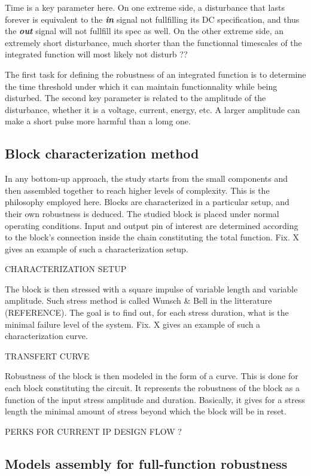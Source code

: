 Time is a key parameter here. On one extreme side, a disturbance that lasts forever is equivalent to the \textbf{\textit{in}} signal not fullfilling its DC specification,
and thus the \textbf{\textit{out}} signal will not fullfill its spec as well.
On the other extreme side, an extremely short disturbance, much shorter than the functionnal timescales of the integrated function will most likely not disturb ??

The first task for defining the robustness of an integrated function is to determine the time threshold under which it can maintain functionnality while being disturbed.
The second key parameter is related to the amplitude of the disturbance, whether it is a voltage, current, energy, etc.
A larger amplitude can make a short pulse more harmful than a lomg one.

\subsection{Block characterization method}
In any bottom-up approach, the study starts from the small components and then assembled together to reach higher levels of complexity.
This is the philosophy employed here.
Blocks are characterized in a particular setup, and their own robustness is deduced.
The studied block is placed under normal operating conditions.
Input and output pin of interest are determined according to the block's connection inside the chain constituting the total function.
Fix. X gives an example of such a characterization setup.

CHARACTERIZATION SETUP

The block is then stressed with a square impulse of variable length and variable amplitude.
Such stress method is called Wunsch & Bell in the litterature (REFERENCE).
The goal is to find out, for each stress duration, what is the minimal failure level of the system.
Fix. X gives an example of such a characterization curve.

TRANSFERT CURVE

Robustness of the block is then modeled in the form of a curve.
This is done for each block constituting the circuit.
It represents the robustness of the block as a function of the input stress amplitude and duration.
Basically, it gives for a stress length the minimal amount of stress beyond which the block will be in reset.

PERKS FOR CURRENT IP DESIGN FLOW ?

\subsection{Models assembly for full-function robustness}

